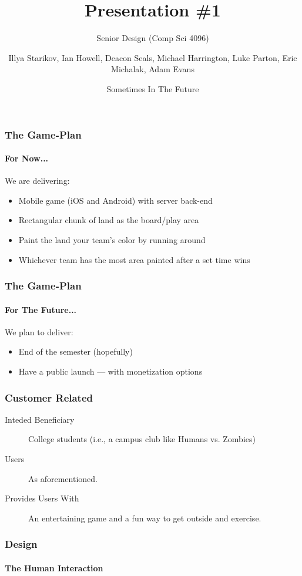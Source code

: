 \documentclass[xcolor=dvipsnames]{beamer}
\title{Presentation \#1}
\subtitle{Senior Design (Comp Sci 4096)}
\author{Illya Starikov, Ian Howell, Deacon Seals, Michael Harrington, Luke Parton, Eric Michalak, Adam Evans}
\date{Sometimes In The Future}
\institute{Missouri University of Science and Technology}
\begin{document}
\begin{darkframes}
    \maketitle


    \begin{frame}
        \frametitle{The Game-Plan}
        \framesubtitle{For Now...}
        We are delivering:

        \begin{itemize}
            \item Mobile game (iOS and Android) with server back-end
            \item Rectangular chunk of land as the board/play area
            \item Paint the land your team's color by running around
            \item Whichever team has the most area painted after a set time wins
        \end{itemize}
    \end{frame}


    \begin{frame}
        \frametitle{The Game-Plan}
        \framesubtitle{For The Future...}

        We plan to deliver:

        \begin{itemize}
            \item End of the semester (hopefully)
            \item Have a public launch --- with monetization options
        \end{itemize}
    \end{frame}


    \begin{frame}
        \frametitle{Customer Related}

        \begin{description}
            \item[Inteded Beneficiary] College students (i.e., a campus club like Humans vs. Zombies)
            \item[\phantom{Placeholder---} Users]           As aforementioned.
            \item[Provides Users With] An entertaining game and a fun way to get outside and exercise.
        \end{description}
    \end{frame}


    \begin{frame}
        \frametitle{Design}
        \framesubtitle{The Human Interaction}


\end{frame}
\end{darkframes}
\end{document}
